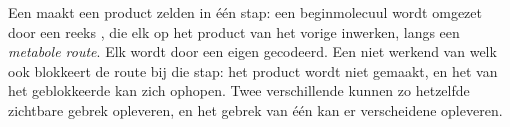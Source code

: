 \begin{proposition}\label{prop:g11:enzymes-and-phenotype:pathway}
Een  maakt een product zelden in één stap: een beginmolecuul wordt
omgezet door een reeks , die elk op het product van het vorige
inwerken, langs een \emph{metabole route}. Elk 
wordt door een eigen  gecodeerd. Een niet werkend  van welk 
ook blokkeert de route bij die stap: het product wordt niet gemaakt, en
het  van het geblokkeerde  kan zich ophopen. Twee
verschillende  kunnen zo hetzelfde zichtbare gebrek opleveren, en het
gebrek van één  kan er verscheidene opleveren.
\end{proposition}
\admitted

